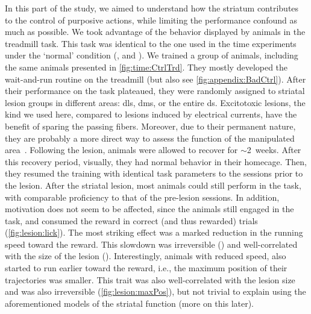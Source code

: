 \par
In this part of the study, we aimed to understand how the striatum contributes to the control of purposive actions, while limiting the performance confound as much as possible.
We took advantage of the behavior displayed by animals in the treadmill task.
This task was identical to the one used in the time experiments under the `normal' condition (, and ).
We trained a group of animals, including the same animals presented in \autoref{fig:time:CtrlTrd}.
They mostly developed the wait-and-run routine on the treadmill (but also see \autoref{fig:appendix:BadCtrl}).
After their performance on the task plateaued, they were randomly assigned to striatal lesion groups in different areas:
    \gls{dls}, \gls{dms}, or the entire \gls{ds}.
Excitotoxic lesions, the kind we used here, compared to lesions induced by electrical currents, have the benefit of sparing the passing fibers.
Moreover, due to their permanent nature, they are probably a more direct way to assess the function of the manipulated area~\cite{Otchy2015Nature}.
Following the lesion, animals were allowed to recover for $\sim$2~weeks.
After this recovery period, visually, they had normal behavior in their homecage.
Then, they resumed the training with identical task parameters to the sessions prior to the lesion.
After the striatal lesion, most animals could still perform in the task, with comparable proficiency to that of the pre-lesion sessions.
In addition, motivation does not seem to be affected, since the animals still engaged in the task, and consumed the reward in correct (and thus rewarded) trials (\autoref{fig:lesion:lick}).
The most striking effect was a marked reduction in the running speed toward the reward.
This slowdown was irreversible () and well-correlated with the size of the lesion ().
Interestingly, animals with reduced speed, also started to run earlier toward the reward, i.e., the maximum position of their trajectories was smaller.
This trait was also well-correlated with the lesion size and was also irreversible (\autoref{fig:lesion:maxPos}), but not trivial to explain using the aforementioned models of the striatal function (more on this later).
